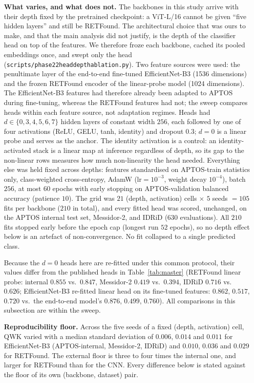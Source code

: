 \documentclass[journal]{IEEEtran}
\renewcommand{\_}{\origunderscore\allowbreak}
\begin{document}
\textbf{What varies, and what does not.} The backbones in this study arrive with
their depth fixed by the pretrained checkpoint: a ViT-L/16 cannot be given
``five hidden layers'' and still be RETFound. The architectural choice that was
ours to make, and that the main analysis did not justify, is the depth of the
classifier head on top of the features. We therefore froze each backbone, cached
its pooled embeddings once, and swept only the head
(\texttt{scripts/\allowbreak{}}\allowbreak\texttt{phase22\_head\_depth\_ablation.py}). Two feature sources were
used: the penultimate layer of the end-to-end fine-tuned EfficientNet-B3
(1536 dimensions) and the frozen RETFound encoder of the linear-probe model (1024 dimensions).
The EfficientNet-B3 features had therefore already been adapted to APTOS during
fine-tuning, whereas the RETFound features had not; the sweep compares heads
within each feature source, not adaptation regimes. Heads had
$d\in\{0,3,4,5,6,7\}$ hidden layers of constant width $256$, each followed by one
of four activations (ReLU, GELU, tanh, identity) and dropout $0.3$; $d=0$ is a
linear probe and serves as the anchor. The identity activation is a control: an
identity-activated stack is a linear map at inference regardless of depth, so its
gap to the non-linear rows measures how much non-linearity the head needed.
Everything else was held fixed across depths: features standardised on APTOS-train
statistics only, class-weighted cross-entropy, AdamW ($\text{lr}=10^{-3}$, weight
decay $10^{-4}$), batch $256$, at most $60$ epochs with early stopping on
APTOS-validation balanced accuracy (patience $10$). The grid was
$21$ (depth, activation) cells $\times$ $5$ seeds $=105$ fits per backbone
($210$ in total), and every fitted head was scored, unchanged, on the APTOS
internal test set, Messidor-2, and IDRiD ($630$ evaluations). All $210$ fits
stopped early before the epoch cap (longest run $52$ epochs), so no depth effect
below is an artefact of non-convergence. No fit collapsed to a single predicted
class.

Because the $d=0$ heads here are re-fitted under this common protocol, their
values differ from the published heads in Table~\ref{tab:master} (RETFound linear
probe: internal $0.855$ vs.\ $0.847$, Messidor-2 $0.419$ vs.\ $0.394$, IDRiD
$0.716$ vs.\ $0.626$; EfficientNet-B3 re-fitted linear head on its fine-tuned
features: $0.862$, $0.517$, $0.720$ vs.\ the end-to-end model's $0.876$,
$0.499$, $0.760$). All comparisons in this subsection are within the sweep.

\textbf{Reproducibility floor.} Across the five seeds of a fixed (depth,
activation) cell, QWK varied with a median standard deviation of $0.006$, $0.014$
and $0.011$ for EfficientNet-B3 (APTOS-internal, Messidor-2, IDRiD) and $0.010$,
$0.036$ and $0.029$ for RETFound. The external floor is three to four times the
internal one, and larger for RETFound than for the CNN. Every difference below is
stated against the floor of its own (backbone, dataset) pair.
\end{document}
